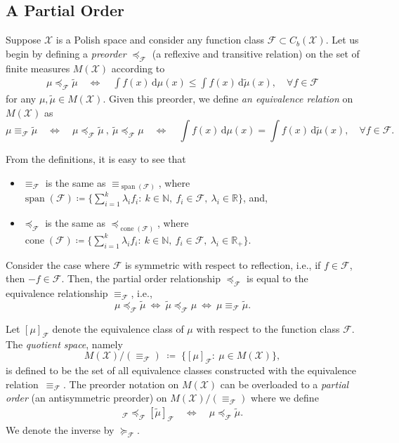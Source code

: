 \documentclass[10pt]{article}
\newcommand{\ud}{\,\mathrm{d}}
\newcommand{\op}[1]{\operatorname{#1}}
\renewcommand{\tilde}{\widetilde}
\newcommand{\calF}{\mathcal{F}}
\newcommand{\calX}{\mathcal{X}}
\numberwithin{equation}{section}
\begin{document}
\subsection{A Partial Order}\label{sec:order}
Suppose $\calX$ is a Polish space and consider any function class $\mathcal{F}\subset C_b(\calX)$. Let us begin by defining a {\em preorder} $\preceq_\calF$ (a reflexive and transitive relation) on the set of finite measures $M(\calX)$ according to
\begin{align*}%
\mu \preceq_\calF \tilde{\mu} \quad \Leftrightarrow\quad \int f(x) \ud \mu(x) \leq \int f(x) \ud \tilde{\mu}(x),\quad \forall f \in \calF
\end{align*}
for any $\mu,\tilde{\mu} \in M(\calX)$. Given this preorder, we define {\em an equivalence relation} on $M(\calX)$ as 
\begin{equation*}%
	\mu \equiv_\calF \tilde{\mu}
	\quad \Leftrightarrow\quad 
	\mu \preceq_\calF \tilde{\mu} ~,~ \tilde{\mu} \preceq_\calF \mu	
	\quad \Leftrightarrow\quad 
	\int f(x) \ud \mu(x) = \int f(x) \ud \tilde{\mu}(x),\quad \forall f \in \calF.
\end{equation*}
\begin{remark}\label{rem:cone-span}
From the definitions, it is easy to see that 
\begin{itemize}
\item $\equiv_\calF$ is the same as $\equiv_{\op{span}(\calF)}$, 
where $\op{span}(\calF) \coloneqq \bigl\{ \sum_{i=1}^k \lambda_i f_i:~ k\in\mathbb{N},~ f_i\in\calF,~ \lambda_i \in \mathbb{R}\bigr\}$, and, 
\item $\preceq_\calF$ is the same as $\preceq_{\op{cone}(\calF)}$, 
where $\op{cone}(\calF) \coloneqq \bigl\{ \sum_{i=1}^k \lambda_i f_i:~ k\in\mathbb{N},~ f_i\in\calF,~ \lambda_i \in \mathbb{R}_+\bigr\}$.
\end{itemize}
\end{remark}
\begin{remark}\label{rem:reflection-symmetry}
Consider the case where $\calF$ is symmetric with respect to reflection, i.e., if $f \in \calF$, then $-f \in \calF$. Then, the partial order relationship $\preceq_\calF$ is equal to the equivalence relationship $\equiv_\calF$, i.e., 
\begin{equation*}
\mu \preceq_\calF \tilde{\mu} ~\Leftrightarrow~\tilde{\mu} \preceq_\calF {\mu} ~\Leftrightarrow~\mu \equiv_\calF \tilde{\mu}.
\end{equation*}
\end{remark}
%
Let $[\mu]_\calF$ denote the equivalence class of $\mu$ with respect to the function class $\calF$. 
The {\em quotient space}, namely 
\[M(\calX)/(\equiv_\calF)\;\coloneqq\;\bigl\{[\mu]_\calF:~ \mu \in M(\calX) \bigr\},\] is defined to be the set of all equivalence classes constructed with the equivalence relation~$\equiv_\calF$. 
The preorder notation on $M(\calX)$ can be overloaded to a {\em partial order} (an antisymmetric preorder) on $M(\calX)/(\equiv_\calF)$ where we define 
\begin{align*}
	[\mu]_\calF \preceq_\calF [\tilde{\mu}]_\calF
	\quad \Leftrightarrow\quad
	\mu \preceq_\calF \tilde{\mu}. 
\end{align*}
We denote the inverse by $\succeq_\calF$. 
\end{document}
